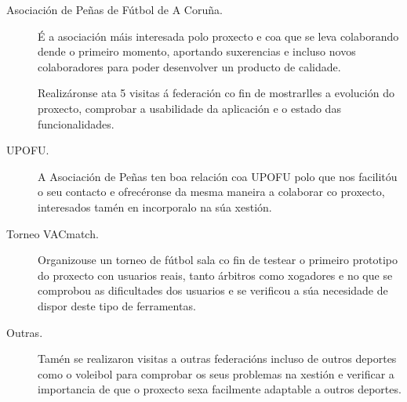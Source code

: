   \begin{description}

  \item [Asociación de Peñas de Fútbol de A Coruña.]
  É a asociación máis interesada polo proxecto e coa que se leva colaborando 
dende o primeiro momento, aportando suxerencias e incluso novos colaboradores 
para poder desenvolver un producto de calidade.

  Realizáronse ata 5 visitas á federación co fin de mostrarlles a evolución do 
proxecto, comprobar a usabilidade da aplicación e o estado das funcionalidades.

  \item [UPOFU.]
  A Asociación de Peñas ten boa relación coa UPOFU polo que nos facilitóu o seu 
contacto e ofrecéronse da mesma maneira a colaborar co proxecto, interesados 
tamén en incorporalo na súa xestión.

  \item [Torneo VACmatch.]
  Organizouse un torneo de fútbol sala co fin de testear o primeiro prototipo 
do proxecto con usuarios reais, tanto árbitros como xogadores e no que se 
comprobou as dificultades dos usuarios e se verificou a súa necesidade de 
dispor deste tipo de ferramentas.

  \item [Outras.]
  Tamén se realizaron visitas a outras federacións incluso de outros deportes 
como o voleibol para comprobar os seus problemas na xestión e verificar a 
importancia de que o proxecto sexa facilmente adaptable a outros deportes.

  \end{description}

